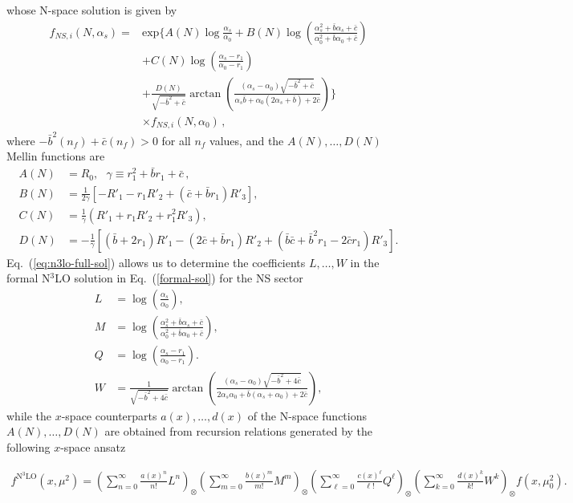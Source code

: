\documentclass[12pt,notitlepage,aps,preprintnumbers,superscriptaddress,nofootinbib,aps,prd,floatfix]{revtex4-2}
\renewenvironment{eqnarray}{\begin{equation}\begin{aligned}}
{\end{aligned}\end{equation}}
\begin{document}
%
whose N-space solution is given by
%
\begin{align}
f_{NS,i}(N,\alpha_s) = &\textrm{exp}\Bigg\{ A(N)\log \frac{\alpha_s}{\alpha_0}  + B(N)\log(\frac{\alpha_s^2 + \bar{b}\alpha_s + \bar{c}}{\alpha_0^2 + \bar{b}\alpha_0 + \bar{c}}) 
\nonumber\\
&+ C(N)\log(\frac{\alpha_s - r_1}{\alpha_0 - r_1}) 
\nonumber\\
&+ \frac{D(N)}{\sqrt{-\bar{b}^2 + \bar{c}}}\arctan\left(\frac{(\alpha_s-\alpha_0)\sqrt{-\bar{b}^2+\bar{c}}}{\alpha_s \bar{b} + \alpha_0(2\alpha_s + \bar{b}) + 2\bar{c}}\right)\Bigg\}
\nonumber\\
&\times f_{NS,i}(N,\alpha_0)\,, 
\label{eq:n3lo-full-sol}
\end{align}
%
where $-\bar{b}^2(n_f)+\bar{c}(n_f)>0$ for all $n_f$ values, and the $A(N),\dots,D(N)$ Mellin functions are
\begin{align}
A(N) &= R_0, ~~~\gamma \equiv r_1^2 + \bar{b} r_1 + \bar{c} \,,
\nonumber\\
B(N) &= \frac{1}{2\gamma}[-R'_1 -r_1 R'_2 + (\bar{c} + \bar{b} r_1)R'_3], 
\nonumber\\
C(N) &= \frac{1}{\gamma}(R'_1 + r_1 R'_2 + r_1^2 R'_3), 
\nonumber\\
D(N) &= -\frac{1}{\gamma}[(\bar{b} + 2r_1) R'_1 - (2\bar{c} + \bar{b} r_1) R'_2 + (\bar{b}\bar{c} + \bar{b}^2 r_1 - 2\bar{c} r_1) R'_3].
\label{eq:n3lo-resum-coeffs}
\end{align}
%
%
%
%
%
Eq.~(\ref{eq:n3lo-full-sol}) allows us to determine the coefficients $L,\dots,W$ in the formal N$^3$LO solution in Eq.~(\ref{formal-sol}) for the NS sector
%
\begin{align}
L &= \log \left(\frac{\alpha_s}{\alpha_0}\right), 
\\
M &= \log \left(\frac{\alpha_s^2 + \bar{b}\alpha_s + \bar{c}}{\alpha_0^2 + \bar{b}\alpha_0 + \bar{c}}\right), 
\\
Q &= \log \left(\frac{\alpha_s - r_1}{\alpha_0 - r_1}\right). 
\\
W &= \frac{1}{\sqrt{-\bar{b}^2+4\bar{c}}}\arctan\left( \frac{(\alpha_s - \alpha_0)\sqrt{-\bar{b}^2+4\bar{c}}}{2\alpha_s\alpha_0 + \bar{b}(\alpha_s+\alpha_0) + 2\bar{c}} \right),
\end{align}
%
while the $x$-space counterparts $a(x),\dots,d(x)$ of the N-space functions $A(N),\dots,D(N)$ are obtained from recursion relations generated by the following $x$-space ansatz   

\begin{small}
\begin{eqnarray}
f^{\mathrm{N}^3\mathrm{LO}}(x,\mu^2) = \left(\sum_{n=0}^\infty \frac{a(x)^n}{n!}L^n\right)_{\otimes}
\left(\sum_{m=0}^\infty \frac{b(x)^m}{m!}M^m\right)_{\otimes}
\left(\sum_{\ell=0}^\infty \frac{c(x)^\ell}{\ell!}Q^\ell\right)_{\otimes}
\left(\sum_{k=0}^\infty \frac{d(x)^k}{k!}W^k \right)_{\otimes} f(x,\mu_0^2).
\label{eq:n3lo-full-mellin-sol}
\end{eqnarray}
\end{small}
\end{document}
